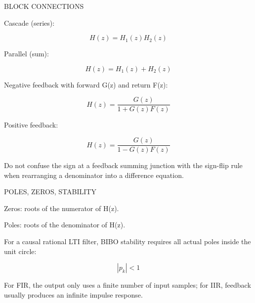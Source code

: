 BLOCK CONNECTIONS

Cascade (series):

$$H(z)=H_1(z)H_2(z)$$

Parallel (sum):

$$H(z)=H_1(z)+H_2(z)$$

Negative feedback with forward G(z) and return F(z):

$$H(z)=\frac{G(z)}{1+G(z)F(z)}$$

Positive feedback:

$$H(z)=\frac{G(z)}{1-G(z)F(z)}$$

Do not confuse the sign at a feedback summing junction with the sign-flip rule when rearranging a denominator into a difference equation.

POLES, ZEROS, STABILITY

Zeros: roots of the numerator of H(z).

Poles: roots of the denominator of H(z).

For a causal rational LTI filter, BIBO stability requires all actual poles inside the unit circle:

$$|p_k|<1$$

For FIR, the output only uses a finite number of input samples; for IIR, feedback usually produces an infinite impulse response.
